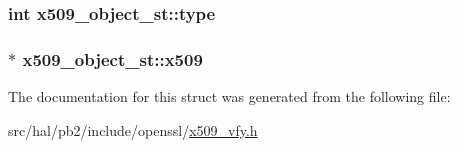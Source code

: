 \subsubsection[{\texorpdfstring{type}{type}}]{\setlength{\rightskip}{0pt plus 5cm}int x509\+\_\+object\+\_\+st\+::type}\hypertarget{structx509__object__st_a9a1693800fb57bf3d3e2f47d2f57ea60}{}\label{structx509__object__st_a9a1693800fb57bf3d3e2f47d2f57ea60}
\subsubsection[{\texorpdfstring{x509}{x509}}]{$\ast$ x509\+\_\+object\+\_\+st\+::x509}\hypertarget{structx509__object__st_ac849472db5581793b83d62c188ddd97d}{}\label{structx509__object__st_ac849472db5581793b83d62c188ddd97d}


The documentation for this struct was generated from the following file\+:\begin{DoxyCompactItemize}
\item 
src/hal/pb2/include/openssl/\hyperlink{x509__vfy_8h}{x509\+\_\+vfy.\+h}\end{DoxyCompactItemize}
